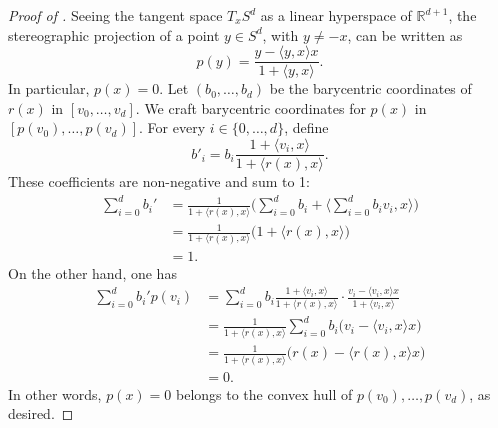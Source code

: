 \documentclass[a4paper,english,cleveref,autoref,thm-restate,nolineno]{socg-lipics-v2021}
\newcommand{\R}{\mathbb R}
\begin{document}
\begin{proof}[Proof of ]
	\label{proof:originstereographicprojection}
	Seeing the tangent space $T_x S^d$ as a linear hyperspace of $\R^{d+1}$, the stereographic projection of a point $y\in S^d$, with $y\neq -x$, can be written as
	\[
	p(y) = \frac{y-\langle y,x\rangle x}{1+\langle y,x\rangle}.
	\]
	In particular, $p(x) = 0$.
	Let $(b_0,\dots,b_d)$ be the barycentric coordinates of $r(x)$ in $[v_0,\dots,v_d]$.
	We craft barycentric coordinates for $p(x)$ in $[p(v_0),\dots,p(v_d)]$.
	For every $i\in\{0,\dots,d\}$, define
	\[
	b'_i = b_i\frac{1+\langle v_i,x\rangle}{1+\langle r(x), x\rangle}.
	\]
	These coefficients are non-negative and sum to 1:
	\begin{align*}
		\sum_{i=0}^{d} b_i' 
		&= \frac{1}{1+\langle r(x), x\rangle}\bigg(\sum_{i=0}^{d} b_i + \big\langle\sum_{i=0}^{d} b_i v_i, x\big\rangle\bigg)\\
		&= \frac{1}{1+\langle r(x), x\rangle}\big(1+\langle r(x),x\rangle\big)\\
		&= 1.
	\end{align*}
	On the other hand, one has
	\begin{align*}
		\sum_{i=0}^{d} b_i' p(v_i)
		&= \sum_{i=0}^{d} b_i \frac{1+\langle v_i,x\rangle}{1+\langle r(x), x\rangle}\cdot \frac{v_i-\langle v_i,x\rangle x}{1+\langle v_i,x\rangle}\\
		&= \frac{1}{1+\langle r(x), x\rangle}\sum_{i=0}^{d} b_i \big(v_i-\langle v_i,x\rangle x\big)\\
		&= \frac{1}{1+\langle r(x), x\rangle}\big(r(x) - \langle r(x),x\rangle x\big)\\
		&= 0.
	\end{align*}
	In other words, $p(x) = 0$ belongs to the convex hull of $p(v_0),\dots,p(v_d)$, as desired.
\end{proof}

\decreasecoveringradius*
\end{document}
